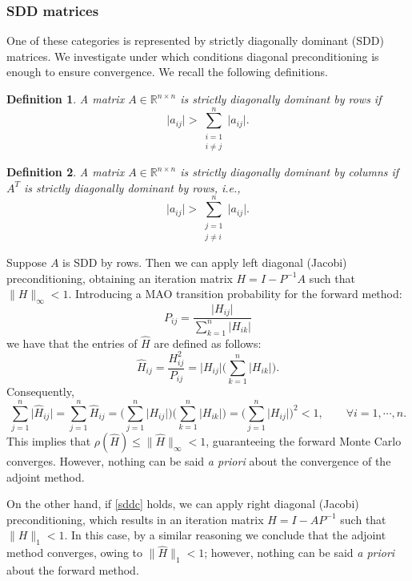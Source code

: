 \documentclass[final,leqno,onefignum,onetabnum]{siamltex1213}
\newtheorem{defn}{Definition}
\begin{document}
\subsubsection{SDD matrices}
\label{sec:sdd}

One of these categories is represented by strictly diagonally dominant
(SDD) matrices. We investigate under which conditions diagonal preconditioning
is enough to ensure convergence.
We recall the following definitions.

\begin{defn}
 A matrix $A\in\mathbb{R}^{n\times n}$ is strictly diagonally dominant
by rows if
 \begin{equation}
    \lvert a_{ij}\rvert>\sum_{\substack{i=1\\ i\ne j}}^{n}\lvert
a_{ij}\rvert .
\label{sddr}
 \end{equation}
\end{defn}

\begin{defn}
 A matrix $A\in\mathbb{R}^{n\times n}$ is strictly diagonally dominant
by columns if $A^T$ is strictly diagonally dominant by rows, i.e.,
 \begin{equation}
    \lvert a_{ij}\rvert>\sum_{\substack{j=1\\ j\ne i}}^{n}\lvert
a_{ij}\rvert .
\label{sddc}
 \end{equation}
\end{defn}

Suppose $A$ is SDD by rows. Then we can apply left diagonal (Jacobi) preconditioning,
obtaining an iteration matrix $H=I-P^{-1}A$ such that $\lVert H
\rVert_{\infty}<1$.
Introducing a MAO transition probability for the forward method:
\[
 P_{ij}=\frac{\lvert H_{ij}\rvert}{\sum_{k=1}^n\lvert H_{ik}\rvert}
\]
we have that the entries of $\hat{H}$ are defined as follows:
\[
 \hat{H}_{ij}=\frac{H^2_{ij}}{P_{ij}}=\lvert H_{ij}\rvert\bigg
(\sum_{k=1}^n\lvert
H_{ik}\rvert\bigg ).
\]
Consequently,
\[
 \sum_{j=1}^n\lvert \hat{H}_{ij} \rvert = \sum_{j=1}^n \hat{H}_{ij} =\bigg
(\sum_{j=1}^n \lvert H_{ij}\rvert\bigg )\bigg (\sum_{k=1}^n\lvert
H_{ik}\rvert\bigg ) =\bigg
(\sum_{j=1}^n \lvert H_{ij}\rvert\bigg ) ^2 <1, \qquad \forall i=1,\cdots, n.
\]
This implies that $\rho(\hat{H})\le \lVert
\hat{H}\rVert_{\infty}<1$, guaranteeing the forward Monte Carlo converges.
However, nothing can be said {\em a priori}
about the convergence of the adjoint method.

On the other hand, if \eqref{sddc} holds, we can apply right diagonal
(Jacobi) preconditioning, which
results in an iteration matrix $H=I-AP^{-1}$ such that $\lVert H
\rVert_{1}<1$.
In this case, by a similar reasoning we
conclude that the adjoint method converges, owing to $\lVert
\hat{H}\rVert_1<1$; however,
nothing can be said \textit{a priori} about the forward method.
\end{document}
